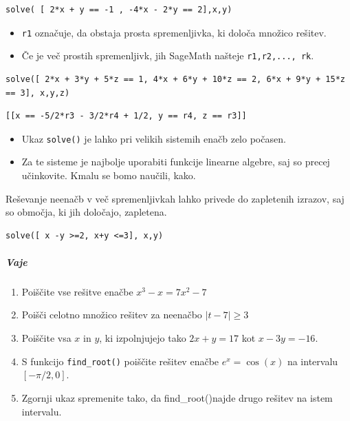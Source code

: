 \begin{verbatim}
solve( [ 2*x + y == -1 , -4*x - 2*y == 2],x,y)
\end{verbatim}

\begin{itemize}
\item \texttt{r1} označuje, da obstaja prosta spremenljivka, ki določa množico rešitev.
\end{itemize}

\begin{itemize}
\item Če je več prostih spremenljivk, jih SageMath našteje \texttt{r1,r2,..., rk}.
\end{itemize}

\begin{verbatim}
solve([ 2*x + 3*y + 5*z == 1, 4*x + 6*y + 10*z == 2, 6*x + 9*y + 15*z == 3], x,y,z)
\end{verbatim}

\begin{verbatim}
[[x == -5/2*r3 - 3/2*r4 + 1/2, y == r4, z == r3]]
\end{verbatim}

\begin{itemize}
\item Ukaz \texttt{solve()} je lahko pri velikih sistemih enačb zelo počasen.
\item Za te sisteme je najbolje uporabiti funkcije linearne algebre, saj so precej učinkovite. Kmalu se bomo naučili, kako.
\end{itemize}

Reševanje neenačb v več spremenljivkah lahko privede do zapletenih izrazov, saj so območja, ki jih določajo, zapletena.

\begin{verbatim}
solve([ x -y >=2, x+y <=3], x,y)
\end{verbatim}

\subparagraph{Vaje}

\begin{enumerate}
\item Poiščite vse rešitve enačbe $x^{3} - x = 7x^{2} -7$
\item Poišči celotno množico rešitev za neenačbo $|t -7| \geq 3$
\item Poiščite vsa $x$ in $y$, ki izpolnjujejo tako $2x+ y= 17$ kot $x -3y= -16$.
\item S funkcijo \texttt{find\_root()} poiščite rešitev enačbe $e^{x} = \cos(x)$ na intervalu $[ -\pi/2,0]$.
\item Zgornji ukaz spremenite tako, da find\_root()najde drugo rešitev na istem intervalu.
\end{enumerate}

